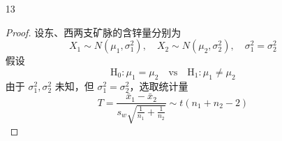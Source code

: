 \documentclass[normal,cn]{elegantnote}
\begin{document}
\begin{enumerate}
\begin{proof}
            由于 $\sigma_{1}^{2},\sigma_{2}^{2}$ 未知，但 $\sigma_{1}^{2}=\sigma_{2}^{2}$。选取统计量
            \begin{equation*}
                T=\frac{\bar{x}-\bar{y}}{s_{w}\sqrt{\frac{1}{n_{1}}+\frac{1}{n_{2}}}}\sim t\left(n_{1}+n_{2}-2\right)
            \end{equation*}
            给定显著性水平 $\alpha=0.01$，对于 $n_{1}=11,n_{2}=12$，有 $t_{1-\alpha}\left(n_{1}+n_{2}-2\right)=t_{0.99}(21)=2.5176$，右侧拒绝域为
            \begin{equation*}
                W=\{t \geq 2.5176\}
            \end{equation*}
            且有
            \begin{gather*}
                \bar{x}=5.5,\quad\bar{y}=4.3667,\quad s_{x}=0.5235, \quad s_{y}=0.4677,\quad n_{1}=11,\quad n_{2}=12 \\
                s_{w}=\sqrt{\frac{\left(n_{1}-1\right)s_{x}^{2}+\left(n_{2}-1\right)s_{y}^{2}}{n_{1}+n_{2}-2}}=\sqrt{\frac{10\times 0.5235^{2}+11\times 0.4677^{2}}{21}}=0.4951
            \end{gather*}
            则
            \begin{equation*}
                t=\frac{5.5-4.3667}{0.4951\times\sqrt{\frac{1}{11}+\frac{1}{12}}}=5.4837\in W
            \end{equation*}
            故拒绝原假设，即可以认为型号 A 的计算器平均使用时间明显比型号 B 来得长。
        \end{proof}
    \item[13]
        \begin{proof}
            设东、西两支矿脉的含锌量分别为
            \begin{equation*}
                X_{1}\sim N\left(\mu_{1},\sigma_{1}^{2}\right),\quad X_{2}\sim N\left(\mu_{2},\sigma_{2}^{2}\right),\quad\sigma_{1}^{2}=\sigma_{2}^{2}
            \end{equation*}
            假设
            \begin{equation*}
                \mathrm{H}_{0}:\mu_{1}=\mu_{2}\quad\text{vs}\quad\mathrm{H}_{1}:\mu_{1}\neq\mu_{2}
            \end{equation*}
            由于 $\sigma_{1}^{2},\sigma_{2}^{2}$ 未知，但 $\sigma_{1}^{2}=\sigma_{2}^{2}$，选取统计量
            \begin{equation*}
                T=\frac{\bar{x}_{1}-\bar{x}_{2}}{s_{w}\sqrt{\frac{1}{n_{1}}+\frac{1}{n_{2}}}}\sim t\left(n_{1}+n_{2}-2\right)
            \end{equation*}

\end{proof}
\end{enumerate}
\end{document}
